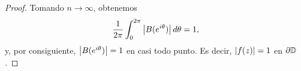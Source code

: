 \begin{proof}
    Tomando $n \rightarrow \infty$, obtenemos
    \begin{equation*}
         \frac{1}{2 \pi}  \int_{0}^{2 \pi} \left\lvert B(e^{i \theta})\right\rvert d \theta = 1,
    \end{equation*}
    y, por consiguiente, $\left\lvert B(e^{i \theta})\right\rvert = 1$ en casi todo punto. Es decir, $\left\lvert f(z)\right\rvert = 1$ en $\partial \mathbb{D}$.
\end{proof}

